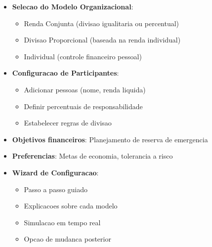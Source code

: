 \begin{itemize}
    \item \textbf{Selecao do Modelo Organizacional}:
    \begin{itemize}
        \item Renda Conjunta (divisao igualitaria ou percentual)
        \item Divisao Proporcional (baseada na renda individual)
        \item Individual (controle financeiro pessoal)
    \end{itemize}
    \item \textbf{Configuracao de Participantes}:
    \begin{itemize}
        \item Adicionar pessoas (nome, renda liquida)
        \item Definir percentuais de responsabilidade
        \item Estabelecer regras de divisao
    \end{itemize}
    \item \textbf{Objetivos financeiros}: Planejamento de reserva de emergencia
    \item \textbf{Preferencias}: Metas de economia, tolerancia a risco
    \item \textbf{Wizard de Configuracao}:
    \begin{itemize}
        \item Passo a passo guiado
        \item Explicacoes sobre cada modelo
        \item Simulacao em tempo real
        \item Opcao de mudanca posterior
    \end{itemize}
\end{itemize}

